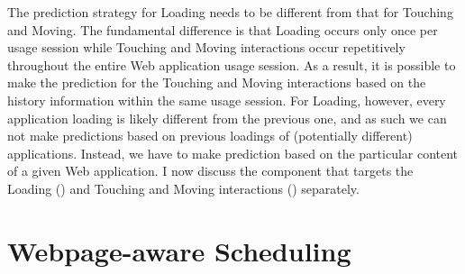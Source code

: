 The prediction strategy for Loading needs to be different from that for Touching and Moving. The fundamental difference is that Loading occurs only once per usage session while Touching and Moving interactions occur repetitively throughout the entire Web application usage session. As a result, it is possible to make the prediction for the Touching and Moving interactions based on the history information within the same usage session. For Loading, however, every application loading is likely different from the previous one, and as such we can not make predictions based on previous loadings of (potentially different) applications. Instead, we have to make prediction based on the particular content of a given Web application. I now discuss the \webrt component that targets the Loading () and Touching and Moving interactions () separately.

\section{Webpage-aware Scheduling}
\label{sec:runtime:load}

\begin{table}[t]
\centering
\captionsetup{width=.7\columnwidth}
\renewcommand*{\arraystretch}{1.05}
\renewcommand*{\tabcolsep}{20pt}
\caption{\small Model Predictors}
\label{tab:feat_list}
\end{table}

